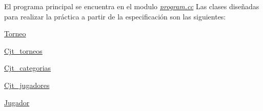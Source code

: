 El programa principal se encuentra en el modulo {\itshape \mbox{\hyperlink{program_8cc}{program.\+cc}}} Las clases diseñadas para realizar la práctica a partir de la especificación son las siguientes\+: 
\begin{DoxyItemize}
\item \mbox{\hyperlink{class_torneo}{Torneo}} 
\item \mbox{\hyperlink{class_cjt__torneos}{Cjt\+\_\+torneos}} 
\item \mbox{\hyperlink{class_cjt__categorias}{Cjt\+\_\+categorias}} 
\item \mbox{\hyperlink{class_cjt__jugadores}{Cjt\+\_\+jugadores}} 
\item \mbox{\hyperlink{class_jugador}{Jugador}} 
\end{DoxyItemize}